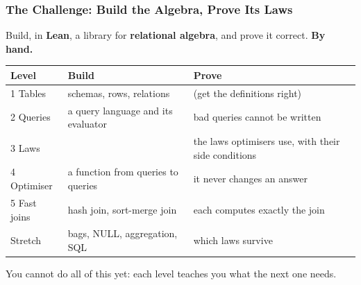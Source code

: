 \begin{frame}
  \frametitle{The Challenge: Build the Algebra, Prove Its Laws}
  \begin{sticky}[halign = center]
    Build, in \textbf{Lean}, a library for \textbf{relational algebra},
    and prove it correct. \textbf{By hand.}
  \end{sticky}
  \medskip
  {\centering\renewcommand{}
    {\headerrow\begin{tabular}{@{}l@{\qquad}>{\raggedright\arraybackslash}p{58mm}@{\qquad}>{\raggedright\arraybackslash}p{58mm}@{}}
      \hline
      \textbf{Level} & \textbf{Build} & \textbf{Prove} \\ \hline
      1 Tables & schemas, rows, relations & (get the definitions right) \\
      2 Queries & a query language and its evaluator & bad queries cannot
        be written \\
      3 Laws & & the laws optimisers use, with their side conditions \\
      4 Optimiser & a function from queries to queries & it never changes
        an answer \\
      5 Fast joins & hash join, sort-merge join & each computes exactly the
        join \\ \hline
      Stretch & bags, NULL, aggregation, SQL & which laws survive \\
      \hline
    \end{tabular}}\par}
  \medskip
  You cannot do all of this yet: each level teaches you what the next one
  needs.
\end{frame}
